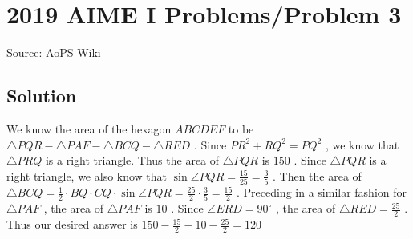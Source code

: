 \documentclass[12pt]{article}
\begin{document}
\section*{{2019 AIME I Problems/Problem 3}}
Source: AoPS Wiki

\subsection*{Solution}
We know the area of the hexagon $ABCDEF$ to be $\triangle PQR- \triangle PAF- \triangle BCQ- \triangle RED$ . Since $PR^2+RQ^2=PQ^2$ , we know that $\triangle PRQ$ is a right triangle. Thus the area of $\triangle PQR$ is $150$ . Since $\triangle PQR$ is a right triangle, we also know that $\sin \angle PQR = \frac{15}{25} = \frac{3}{5}$ . Then the area of $\triangle BCQ = \frac12 \cdot BQ \cdot CQ \cdot \sin \angle PQR= \frac{25}{2}\cdot \frac{3}{5}=\frac{15}{2}$ . Preceding in a similar fashion for $\triangle PAF$ , the area of $\triangle PAF$ is $10$ . Since $\angle ERD = 90^{\circ}$ , the area of $\triangle RED=\frac{25}{2}$ . Thus our desired answer is $150-\frac{15}{2}-10-\frac{25}{2}=\boxed{120}$
\end{document}
